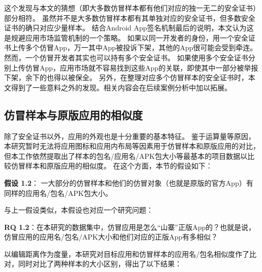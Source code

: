 这个发现与本文的猜想（即大多数仿冒样本都有他们对应的独一无二的安全证书）部分相符。
虽然并不是大多数仿冒样本都有其单独对应的安全证书，但多数安全证书的确只对应少量样本。
结合Android App签名机制最后的说明，本文认为这是规避应用市场监管机制的一个策略。
如果以同一开发者的身份，用一个安全证书上传多个仿冒App，万一其中App被投诉下架，其他的App很可能会受到牵连。
然而，一个仿冒开发者其实也可以持有多个安全证书。
如果使用多个安全证书分别上传仿冒App，应用市场就不容易找到这些App的关联，即使其中一部分被举报下架，余下的也得以被保全。
另外，在整理对应多个仿冒样本的安全证书时，本文得到了一些意料之外的发现。相关内容会在后续案例分析中加以拓展。

\subsection{仿冒样本与原版应用的相似度}

除了安全证书以外，应用的外观也是十分重要的基本特征。
鉴于运算量等原因，本研究暂时无法将应用图标和应用内布局等因素用于仿冒样本和原版应用的对比，但本工作依然提取出了样本的包名/应用名/APK包大小等最基本的项目数据以比较仿冒样本和原版应用的相似度。
在这个方面，本节的假设如下：

{\bf 假设 1.2}： 一大部分的仿冒样本和他们的仿冒对象（也就是原版的官方App）有同样的应用名/包名/APK包大小。

与上一假设类似，本假设也对应一个研究问题：

{\bf RQ 1.2}：在本研究的数据集中，仿冒应用是怎么``山寨''正版App的？也就是说，仿冒应用的应用名/包名/APK大小和他们对应的正版App有多相似？

以编辑距离作为度量，本研究对目标应用和仿冒样本的应用名/包名相似度作了比对，同时对比了两种样本的大小区别，得出了以下结果：

